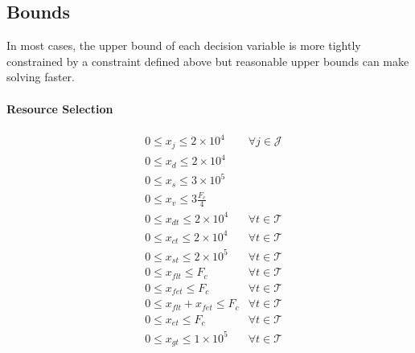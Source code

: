 \documentclass[9pt, oneside]{article}
\numberwithin{equation}{subsubsection}
\begin{document}
\subsection{Bounds}\label{subsec:bounds}
In most cases, the upper bound of each decision variable is more tightly constrained by a constraint defined above but reasonable upper bounds can make solving faster.

\paragraph{Resource Selection}
\begin{subequations}
	\begin{align}
		 & 0 \leq x_{j} \leq 2\times10^4                        & \forall j \in \mathcal{J}\label{eqn:bound0}  \\
		 & 0 \leq x_{d} \leq 2\times10^4 \label{eqn:bound1}                                                    \\
		 & 0 \leq x_{s} \leq 3\times10^5 \label{eqn:bound1}                                                    \\
		 & 0 \leq x_{v} \leq 3\frac{F_c}{4} \label{eqn:bound1b}                                                \\
		 & 0 \leq x_{dt} \leq 2\times10^4                       & \forall t \in \mathcal{T}\label{eqn:bound2}  \\
		 & 0 \leq x_{ct} \leq 2\times10^4                       & \forall t \in \mathcal{T}\label{eqn:bound3}  \\
		 & 0 \leq x_{st} \leq 2\times10^5                       & \forall t \in \mathcal{T}\label{eqn:bound4}  \\
		 & 0 \leq x_{flt} \leq F_c                              & \forall t \in \mathcal{T}\label{eqn:bound5}  \\
		 & 0 \leq x_{fet} \leq F_c                              & \forall t \in \mathcal{T}\label{eqn:bound6}  \\
		 & 0 \leq x_{flt} + x_{fet} \leq F_c                    & \forall t \in \mathcal{T}\label{eqn:bound6b} \\
		 & 0 \leq x_{et} \leq F_c                               & \forall t \in \mathcal{T}\label{eqn:bound7}  \\
		 & 0 \leq x_{gt} \leq 1\times10^5                       & \forall t \in \mathcal{T}\label{eqn:bound8}
	\end{align}
\end{subequations}
\end{document}
